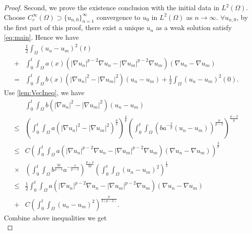 \documentclass[11pt]{amsart}
\theoremstyle{definition}
\numberwithin{equation}{section}
\newcommand*\abs[1]{\lvert#1\rvert}
\newcommand*\Brace[1]{\lbrace#1\rbrace}
\begin{document}
\begin{proof}
	Second, we prove the existence conclusion with the initial data in $L^2(\Omega)$.
	Choose $C_c^{\infty}(\Omega) \supset \Brace{u_{n, 0}}_{n=1}^{\infty} $
	convergence to $u_0$ in $L^2(\Omega) $ as $n \to \infty $. $\forall u_{n, 0}$,
	by the first part of this proof, there exist a unique $u_n$ as a weak solution satisfy \cref{eq:main}.
	Hence we have
	\begin{equation}
		\begin{split}
			& \frac{1}{2}\int_{\Omega}\left(u_n-u_m\right)^2(t)\\
			+{} & \int_{0}^{t}\int_{\Omega}a(x)
			\left(\abs{\nabla u_n}^{p-2}\nabla u_n
			- \abs{\nabla u_m}^{p-2}\nabla u_m\right)
			\left(\nabla u_n - \nabla u_m\right)\\
			={} & \int_{0}^{t}\int_{\Omega}b(x)\left(\abs{\nabla u_n}^2
			- \abs{\nabla u_m}^2\right)\left(u_n - u_m\right)
			+ \frac{1}{2}\int_{\Omega}\left(u_n-u_m\right)^2(0).
		\end{split}
	\end{equation}
	Use \cref{lem:VecIneq}, we have
	\begin{equation}
		\begin{split}
			& \int_{0}^{t}\int_{\Omega}b\left(\abs{\nabla u_n}^2
			- \abs{\nabla u_m}^2\right)\left(u_n - u_m\right)\\
			\leq{} & \left(\int_0^t\int_{\Omega}a\left(\abs{\nabla u_n}^2
			- \abs{\nabla u_m}^2\right)^{\frac{p}{2}}\right)^{\frac{2}{p}}
			\left(\int_0^t\int_{\Omega}\left(ba^{-\frac{2}{p}}
			\left(u_n-u_m\right)\right)^{\frac{p}{p-2}}\right)^{\frac{p-2}{p}}\\
			\leq{} & C\left(\int_0^t\int_{\Omega}a
			\left(\abs{\nabla u_n}^{p-2}\nabla u_n
			- \abs{\nabla u_m}^{p-2}\nabla u_m\right)
			\left(\nabla u_n - \nabla u_m\right)\right)^{\frac{2}{p}}\\
			\times{} & \left(\int_0^t\int_{\Omega}b^{\frac{2p}{p-4}}a^{-\frac{4}{p-4}}\right)^{\frac{p-4}{2p}}
			\left(\int_0^t\int_{\Omega}\left(u_n-u_m\right)^2\right)^{\frac{1}{2}}\\
			\leq{} & \frac{1}{2}\int_0^t\int_{\Omega}a
			\left(\abs{\nabla u_n}^{p-2}\nabla u_n
			- \abs{\nabla u_m}^{p-2}\nabla u_m\right)
			\left(\nabla u_n - \nabla u_m\right)\\
			+{} & C\left(\int_0^t\int_{\Omega}\left(u_n-u_m\right)^2\right)^{\frac{p}{2(p-2)}}.
		\end{split}
	\end{equation}
	Combine above inequalities we get
	\begin{equation}\label{un-umL2_0TW1p_bd_0TL2_L20}

\end{equation}
\end{proof}
\end{document}
